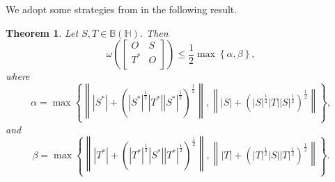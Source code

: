 \documentclass[12pt,twoside,reqno]{amsart}
\newtheorem{theorem}{Theorem}[section]
\numberwithin{equation}{section}
\begin{document}
We adopt some strategies from \cite[Theorem 2.1]{SMK} in the following result.
\begin{theorem}\label{24}
Let $S, T\in \mathbb B\left( \mathbb H \right)$. Then 
\[\omega \left( \left[ \begin{matrix}
   O & S  \\
   {{T}^{*}} & O  \\
\end{matrix} \right] \right)\le \frac{1}{2}\max \left\{ \alpha ,\beta  \right\},\]
where
\[\alpha =\max \left\{ \left\| \left| {{S}^{*}} \right|+{{\left( {{\left| {{S}^{*}} \right|}^{\frac{1}{2}}}\left| {{T}^{*}} \right|{{\left| {{S}^{*}} \right|}^{\frac{1}{2}}} \right)}^{\frac{1}{2}}} \right\|,\left\| \left| S \right|+{{\left( {{\left| S \right|}^{\frac{1}{2}}}\left| T \right|{{\left| S \right|}^{\frac{1}{2}}} \right)}^{\frac{1}{2}}} \right\| \right\},\]
and
\[\beta =\max \left\{ \left\| \left| {{T}^{*}} \right|+{{\left( {{\left| {{T}^{*}} \right|}^{\frac{1}{2}}}\left| {{S}^{*}} \right|{{\left| {{T}^{*}} \right|}^{\frac{1}{2}}} \right)}^{\frac{1}{2}}} \right\|,\left\| \left| T \right|+{{\left( {{\left| T \right|}^{\frac{1}{2}}}\left| S \right|{{\left| T \right|}^{\frac{1}{2}}} \right)}^{\frac{1}{2}}} \right\| \right\}.\]
\end{theorem}
\end{document}
